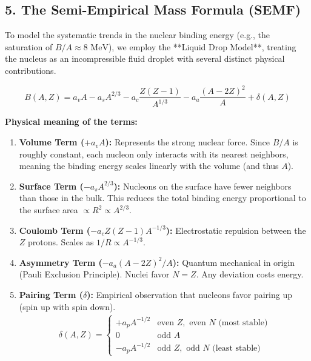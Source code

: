 \subsection*{5. The Semi-Empirical Mass Formula (SEMF)}
To model the systematic trends in the nuclear binding energy (e.g., the saturation of $B/A \approx 8 \text{ MeV}$), we employ the **Liquid Drop Model**, treating the nucleus as an incompressible fluid droplet with several distinct physical contributions.

\begin{equation}\boxed{
    B(A,Z) = a_v A - a_s A^{2/3} - a_c \frac{Z(Z-1)}{A^{1/3}} - a_a \frac{(A-2Z)^2}{A} + \delta(A,Z)
    \label{eq:lec02:semf}
}\end{equation}

\textbf{Physical meaning of the terms:}
\begin{enumerate}
    \item \textbf{Volume Term ($+a_v A$):} Represents the strong nuclear force. Since $B/A$ is roughly constant, each nucleon only interacts with its nearest neighbors, meaning the binding energy scales linearly with the volume (and thus $A$).
    \item \textbf{Surface Term ($-a_s A^{2/3}$):} Nucleons on the surface have fewer neighbors than those in the bulk. This reduces the total binding energy proportional to the surface area $\propto R^2 \propto A^{2/3}$.
    \item \textbf{Coulomb Term ($-a_c Z(Z-1) A^{-1/3}$):} Electrostatic repulsion between the $Z$ protons. Scales as $1/R \propto A^{-1/3}$.
    \item \textbf{Asymmetry Term ($-a_a (A-2Z)^2 / A$):} Quantum mechanical in origin (Pauli Exclusion Principle). Nuclei favor $N = Z$. Any deviation costs energy.
    \item \textbf{Pairing Term ($\delta$):} Empirical observation that nucleons favor pairing up (spin up with spin down).
    \begin{align*}
        \delta(A,Z) = 
        \begin{cases} 
        +a_p A^{-1/2} & \text{even } Z, \text{ even } N \text{ (most stable)} \\
        0 & \text{odd } A \\
        -a_p A^{-1/2} & \text{odd } Z, \text{ odd } N \text{ (least stable)}
        \end{cases}
    \end{align*}
\end{enumerate}

